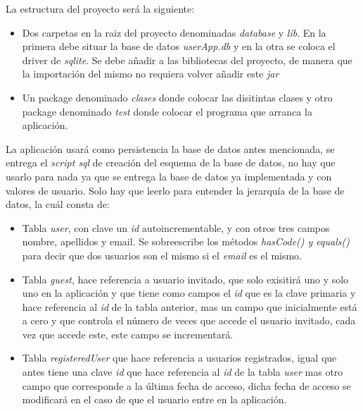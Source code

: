 \documentclass[addpoints,12pt]{exam}
\begin{document}
\begin{center}
\end{center}
\vspace{0.1in}
La estructura del proyecto será la siguiente:
\begin{itemize}
\item Dos carpetas en la raiz del proyecto denominadas \emph{database} y \emph{lib}. En la primera debe situar la base de datos \emph{userApp.db} y en la otra se coloca el driver de \emph{sqlite}. Se debe añadir a las bibliotecas del proyecto, de manera que la importación del mismo no requiera volver añadir este \emph{jar}
\item Un package denominado \emph{clases} donde colocar las disitintas clases y otro package denominado \emph{test} donde colocar el programa que arranca la aplicación.
\end{itemize}
La aplicación usará como persistencia la base de datos antes mencionada, se entrega el \emph{script sql} de creación del esquema de la base de datos, no hay que usarlo para nada ya que se entrega la base de datos ya implementada y con valores de usuario. Solo hay que leerlo para entender la jerarquía de la base de datos, la cuál consta de:
\begin{itemize}
\item Tabla \emph{user}, con clave un \emph{id} autoincrementable, y con otros tres campos nombre, apellidos y email. Se sobreescribe los métodos \emph{hasCode() y equals()} para decir que dos usuarios son el mismo si el \emph{email} es el mismo.
\item Tabla \emph{guest}, hace referencia a usuario invitado, que solo exisitirá uno y solo uno en la aplicación y que tiene como campos el \emph{id} que es la clave primaria y hace referencia al \emph{id} de la tabla anterior, mas un campo que inicialmente está a cero y que controla el número de veces que accede el usuario invitado, cada vez que accede este, este campo se incrementará.
\item Tabla \emph{registeredUser} que hace referencia a usuarios registrados, igual que antes tiene una clave \emph{id} que hace referencia al \emph{id} de la tabla \emph{user} mas otro campo que corresponde a la última fecha de acceso, dicha fecha de acceso se modificará en el caso de que el usuario entre en la aplicación.
\end{itemize}
\newpage
\end{document}
